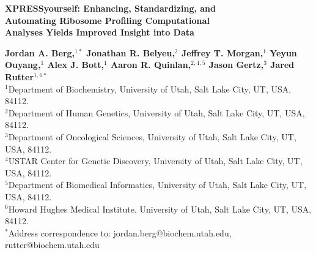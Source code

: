 \documentclass[10pt, oneside]{article}
\date{}
\begin{document}
\modulolinenumbers[1]
\linenumbers
\baselineskip24pt

\noindent
{\huge
\textbf{XPRESSyourself: Enhancing, Standardizing, and \\
Automating Ribosome Profiling Computational \\
Analyses Yields Improved Insight into Data
}
}

\bigskip




\noindent
{\large
\textbf{Jordan A. Berg,$^{1\ast}$ Jonathan R. Belyeu,$^{2}$ Jeffrey T. Morgan,$^{1}$ Yeyun Ouyang,$^{1}$ Alex J. Bott,$^{1}$ Aaron R. Quinlan,$^{2,4,5}$ Jason Gertz,$^{3}$ Jared Rutter$^{1,6\ast}$
}
} \\

\noindent
{$^{1}$Department of Biochemistry, University of Utah, Salt Lake City, UT, USA, 84112.}\\
{$^{2}$Department of Human Genetics, University of Utah, Salt Lake City, UT, USA, 84112.}\\
{$^{3}$Department of Oncological Sciences, University of Utah, Salt Lake City, UT, USA, 84112.}\\
{$^{4}$USTAR Center for Genetic Discovery, University of Utah, Salt Lake City, UT, USA, 84112.}\\
{$^{5}$Department of Biomedical Informatics, University of Utah, Salt Lake City, UT, USA, 84112.}\\
{$^{6}$Howard Hughes Medical Institute, University of Utah, Salt Lake City, UT, USA, 84112.}\\
{$^\ast$Address correspondence to: jordan.berg@biochem.utah.edu, rutter@biochem.utah.edu}

\pagebreak

\end{document}
